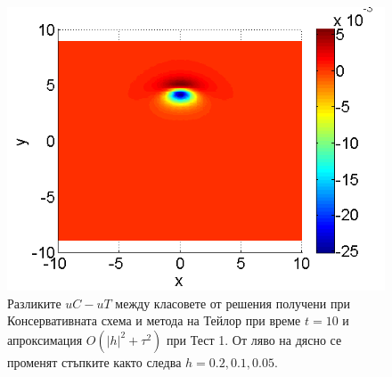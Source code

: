 \documentclass[a4paper]{article}
\theoremstyle{remark}
\begin{document}
\begin{figure}[ht]
\begin{minipage}[b]{0.32\linewidth}
		\includegraphics[width=\linewidth]{SolutionDiff/TaylorZeroBndVsEnergySave_30_ZB2_bt3_c045_h005_O(h^2).png}
	\end{minipage}
\caption{Разликите $uC - uT$ между класовете от решения получени при Консервативната схема и метода на Тейлор при време $t=10$ и апроксимация $O(|h|^2 + \tau^2)$ при Тест 1. От ляво на дясно се променят стъпките както следва $h=0.2, 0.1, 0.05$.}
\label{Test1_Diff}
\end{figure}
\FloatBarrier
\end{document}
